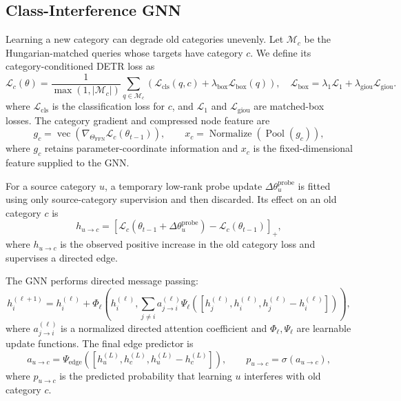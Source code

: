 \subsection{Class-Interference GNN}
\label{sec:class_interference_gnn}

Learning a new category can degrade old categories unevenly. Let
$\mathcal{M}_c$ be the Hungarian-matched queries whose targets have category
$c$. We define its category-conditioned DETR loss as
\begin{equation}
\mathcal{L}_c(\theta)=\frac{1}{\max(1,|\mathcal{M}_c|)}
\sum_{q\in\mathcal{M}_c}\left(\mathcal{L}_{\mathrm{cls}}(q,c)+
\lambda_{\mathrm{box}}\mathcal{L}_{\mathrm{box}}(q)\right),\quad
\mathcal{L}_{\mathrm{box}}=\lambda_1\mathcal{L}_1+
\lambda_{\mathrm{giou}}\mathcal{L}_{\mathrm{giou}}.
\label{eq:category_detection_loss}
\end{equation}
where $\mathcal{L}_{\mathrm{cls}}$ is the classification loss for $c$,
and $\mathcal{L}_1$ and $\mathcal{L}_{\mathrm{giou}}$ are matched-box
losses. The category gradient and compressed node feature are
\begin{equation}
g_c=\operatorname{vec}\left(\nabla_{\Theta_{\mathrm{FFN}}}
\mathcal{L}_c(\theta_{t-1})\right),\qquad
x_c=\operatorname{Normalize}(\operatorname{Pool}(g_c)),
\label{eq:class_gradient}
\end{equation}
where $g_c$ retains parameter-coordinate information and $x_c$ is the
fixed-dimensional feature supplied to the GNN.

For a source category $u$, a temporary low-rank probe update
$\Delta\theta^{\mathrm{probe}}_u$ is fitted using only source-category
supervision and then discarded. Its effect on an old category $c$ is
\begin{equation}
h_{u\rightarrow c}=\left[\mathcal{L}_c(\theta_{t-1}+
\Delta\theta^{\mathrm{probe}}_u)-\mathcal{L}_c(\theta_{t-1})\right]_+,
\label{eq:empirical_harm}
\end{equation}
where $h_{u\rightarrow c}$ is the observed positive increase in the old
category loss and supervises a directed edge.

The GNN performs directed message passing:
\begin{equation}
h_i^{(\ell+1)}=h_i^{(\ell)}+\Phi_\ell\left(h_i^{(\ell)},
\sum_{j\ne i}a_{j\rightarrow i}^{(\ell)}\Psi_\ell([h_j^{(\ell)},
h_i^{(\ell)},h_j^{(\ell)}-h_i^{(\ell)}])\right),
\label{eq:gnn_message_passing}
\end{equation}
where $a_{j\rightarrow i}^{(\ell)}$ is a normalized directed attention
coefficient and $\Phi_\ell,\Psi_\ell$ are learnable update functions.
The final edge predictor is
\begin{equation}
a_{u\rightarrow c}=\Psi_{\mathrm{edge}}([h_u^{(L)},h_c^{(L)},
h_u^{(L)}-h_c^{(L)}]),\qquad p_{u\rightarrow c}=\sigma(a_{u\rightarrow c}),
\label{eq:edge_prediction}
\end{equation}
where $p_{u\rightarrow c}$ is the predicted probability that learning $u$
interferes with old category $c$.

